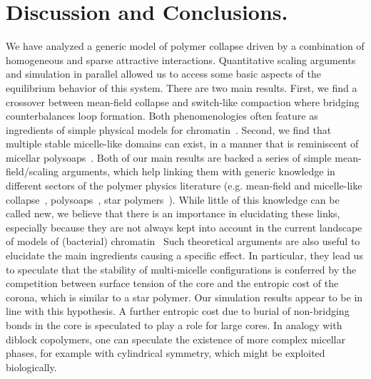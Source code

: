\documentclass[
preprint,
a4paper,
12pt,
superscriptaddress,
pre]{revtex4}
\begin{document}


\section{Discussion and Conclusions. }
\label{sec:Disc}


We have analyzed a generic model of polymer collapse driven by a
combination of homogeneous and sparse attractive interactions.
Quantitative scaling arguments and simulation in parallel allowed us
to access some basic aspects of the equilibrium behavior of this
system.
%
%
There are two main results. 
First, we find a crossover between mean-field collapse and switch-like
compaction where bridging counterbalances loop formation. Both
phenomenologies often feature as ingredients of simple physical models
for
chromatin~\cite{Marenduzzo2006c,Brackley2013,Barbieri2013b,Mirny2011,Buenemann2010}.
Second, we find that multiple stable micelle-like domains can exist,
in a manner that is reminiscent of micellar
polysoaps~\cite{Borisov1996}.
%
Both of our main results are backed a series of simple
mean-field/scaling arguments, which help linking them with generic
knowledge in different sectors of the polymer physics literature
(e.g. mean-field and micelle-like
collapse~\cite{DeGennes1975,Marenduzzo2006c},
polysoaps~\cite{Borisov1996}, star polymers~\cite{Daoud1982,Hsu2004}).
While little of this knowledge can be called new, we believe that
there is an importance in elucidating these links, especially because
they are not always kept into account in the current landscape of
models of (bacterial) chromatin~\cite{Benza2012,Barbieri2013a}
Such theoretical arguments are also useful to elucidate the main
ingredients causing a specific effect. In particular, they lead us to
speculate that the stability of multi-micelle configurations is
conferred by the competition between surface tension of the core and
the entropic cost of the corona, which is similar to a star
polymer. Our simulation results appear to be in line with this
hypothesis. A further entropic cost due to burial of non-bridging
bonds in the core is speculated to play a role for  large cores.
In analogy with diblock copolymers, one can speculate the existence of
more complex micellar phases, for example with cylindrical symmetry,
which might be exploited biologically. 
\end{document}
